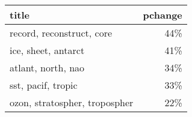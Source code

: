 \begin{tabular}{p{1.2cm}r}
\toprule
                         title &  pchange \\
\midrule
     record, reconstruct, core &      44\% \\
           ice, sheet, antarct &      41\% \\
            atlant, north, nao &      34\% \\
            sst, pacif, tropic &      33\% \\
 ozon, stratospher, tropospher &      22\% \\
\bottomrule
\end{tabular}
